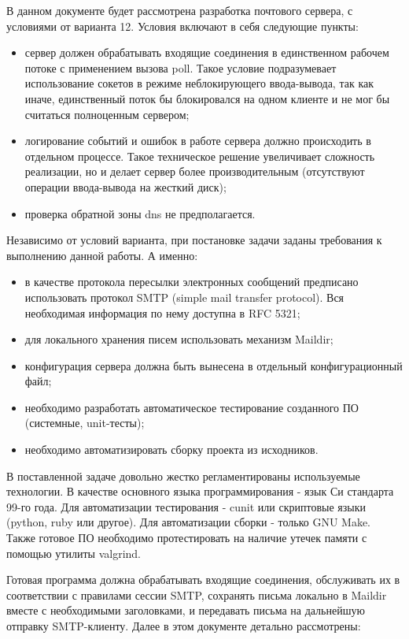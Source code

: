 \documentclass[a4paper,12pt]{report}
\begin{document}
В данном документе будет рассмотрена разработка почтового сервера, с условиями от варианта 12. Условия включают в себя следующие пункты:
\begin{itemize}
	\item сервер должен обрабатывать входящие соединения в единственном рабочем потоке с применением вызова poll. Такое условие подразумевает использование сокетов в режиме неблокирующего ввода-вывода, так как иначе, единственный поток бы блокировался на одном клиенте и не мог бы считаться полноценным сервером;
	\item логирование событий и ошибок в работе сервера должно происходить в отдельном процессе. Такое техническое решение увеличивает сложность реализации, но и делает сервер более производительным (отсутствуют операции ввода-вывода на жесткий диск);
	\item проверка обратной зоны dns не предполагается.
\end{itemize}
Независимо от условий варианта, при постановке задачи заданы требования к выполнению данной работы. А именно:
\begin{itemize}
	\item в качестве протокола пересылки электронных сообщений предписано использовать протокол SMTP (simple mail transfer protocol). Вся необходимая информация по нему доступна в RFC 5321;
	\item для локального хранения писем использовать механизм Maildir;
	\item конфигурация сервера должна быть вынесена в отдельный конфигурационный файл;
	\item необходимо разработать автоматическое тестирование созданного ПО (системные, unit-тесты);
	\item необходимо автоматизировать сборку проекта из исходников.
\end{itemize}

В поставленной задаче довольно жестко регламентированы используемые технологии. В качестве основного языка программирования - язык Си стандарта 99-го года. Для автоматизации тестирования - cunit или скриптовые языки (python, ruby или другое). Для автоматизации сборки - только GNU Make. Также готовое ПО необходимо протестировать на наличие утечек памяти с помощью утилиты valgrind.

Готовая программа должна обрабатывать входящие соединения, обслуживать их в соответствии с правилами сессии SMTP, сохранять письма локально в Maildir вместе с необходимыми заголовками, и передавать письма на дальнейшую отправку SMTP-клиенту. Далее в этом документе детально рассмотрены:
\end{document}
